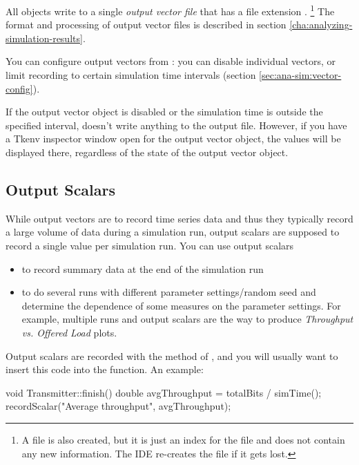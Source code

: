 All  objects write to a single \textit{output vector file}
that has a file extension .
  \footnote{A  file is also created, but it is just an index for
  the  file and does not contain any new information. The IDE
  re-creates the  file if it gets lost.}
The format and processing of output vector files is described in section
\ref{cha:analyzing-simulation-results}.

You can configure output vectors from :
you can disable individual vectors, or limit recording to certain
simulation time intervals (section \ref{sec:ana-sim:vector-config}).

If the output vector object is disabled or the simulation time is
outside the specified interval,  doesn't write
anything to the output file. However, if you have a Tkenv inspector
window open for the output vector object,
the values will be displayed there, regardless of the state of the
output vector object.



\subsection{Output Scalars}

While output vectors are to record time series data and thus they
typically record a large volume of data during a simulation run,
output scalars are supposed to record a single
value per simulation run. You can use output scalars

\begin{itemize}
\item{to record summary data at the end of the simulation run}
\item{to do several runs with different parameter settings/random seed
    and determine the dependence of some measures on the parameter
    settings. For example, multiple runs and output scalars are the
    way to produce \textit{Throughput vs. Offered Load} plots.}
\end{itemize}

Output scalars are recorded with the  method of
, and you will usually want to insert this code
into the  function. An example:

\begin{cpp}
void Transmitter::finish()
{
    double avgThroughput = totalBits / simTime();
    recordScalar("Average throughput", avgThroughput);
}
\end{cpp}

